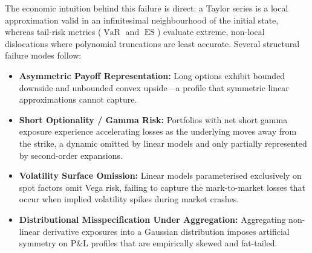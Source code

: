 \documentclass{article}
\theoremstyle{plain}
\theoremstyle{definition}
\theoremstyle{remark}
\DeclareMathOperator{\VaR}{VaR}
\DeclareMathOperator{\ES}{ES}
\begin{document}
The economic intuition behind this failure is direct: a Taylor series is a local approximation valid in an infinitesimal neighbourhood of the initial state, whereas tail-risk metrics ($\VaR$ and $\ES$) evaluate extreme, non-local dislocations where polynomial truncations are least accurate. Several structural failure modes follow:
\begin{itemize}
    \item \textbf{Asymmetric Payoff Representation:} Long options exhibit bounded downside and unbounded convex upside—a profile that symmetric linear approximations cannot capture.
    \item \textbf{Short Optionality / Gamma Risk:} Portfolios with net short gamma exposure experience accelerating losses as the underlying moves away from the strike, a dynamic omitted by linear models and only partially represented by second-order expansions.
    \item \textbf{Volatility Surface Omission:} Linear models parameterised exclusively on spot factors omit Vega risk, failing to capture the mark-to-market losses that occur when implied volatility spikes during market crashes.
    \item \textbf{Distributional Misspecification Under Aggregation:} Aggregating non-linear derivative exposures into a Gaussian distribution imposes artificial symmetry on P\&L profiles that are empirically skewed and fat-tailed.
\end{itemize}
\end{document}
